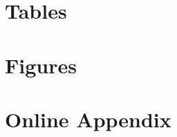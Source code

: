 \documentclass{article}
\begin{document}
\clearpage
\section*{Tables}


\clearpage
\section*{Figures}


\clearpage
\appendix
\section*{Online Appendix}
\renewcommand{\thesection}{S\arabic{section}}
\renewcommand{\thesubsection}{S\arabic{section}.\arabic{subsection}}
\renewcommand{\thefigure}{S\arabic{figure}}
\renewcommand{\thetable}{S\arabic{table}}
\renewcommand{\theequation}{S\arabic{equation}}
\renewcommand{\thealgorithm}{S\arabic{algorithm}}
\renewcommand{\theHsection}{supp.\arabic{section}}
\renewcommand{\theHsubsection}{supp.\arabic{section}.\arabic{subsection}}
\renewcommand{\theHfigure}{supp.\arabic{figure}}
\renewcommand{\theHtable}{supp.\arabic{table}}
\renewcommand{\theHequation}{supp.\arabic{equation}}
\renewcommand{\theHalgorithm}{supp.\arabic{algorithm}}
\setcounter{section}{0}
\setcounter{figure}{0}
\setcounter{table}{0}
\setcounter{equation}{0}
\setcounter{algorithm}{0}


\end{document}
